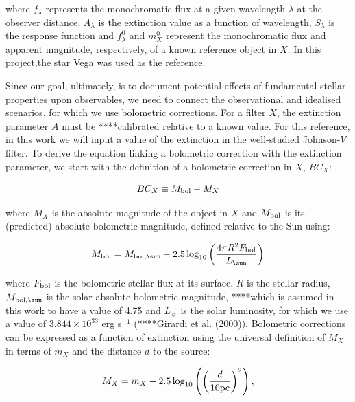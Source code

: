 \documentclass[usenatbib]{mnras}
\begin{document}
where $f_{\lambda}$ represents the monochromatic flux at a given wavelength $\lambda$ at the observer distance, $A_{\lambda}$ is the extinction value as a function of wavelength, $S_{\lambda}$ is the response function and $f_{\lambda}^{0}$ and $m_{X}^{0}$ represent the monochromatic flux and apparent magnitude, respectively, of a known reference object in $X$. In this project,the star Vega was used as the reference.

Since our goal, ultimately, is to document potential effects of fundamental stellar properties upon observables, we need to connect the observational and idealised scenarios, for which we use bolometric corrections. For a filter $X$, the extinction parameter $A$ must be ****calibrated relative to a known value. For this reference, in this work we will input a value of the extinction in the well-studied Johnson-$V$ filter.
To derive the equation linking a bolometric correction with the extinction parameter, we start with the definition of a bolometric correction in $X$, $BC_{X}$:

\begin{equation}
BC_{X} \equiv M_{\textnormal{bol}} - M_{X}
\label{BC_def}
\end{equation}

where $M_{X}$ is the absolute magnitude of the object in $X$ and $M_{\textnormal{bol}}$ is its (predicted) absolute bolometric magnitude, defined relative to the Sun using:

\begin{equation}
M_{\textnormal{bol}} = M_{\textnormal{bol},\sun} - 2.5 \log_{10} \left( \frac{4\pi R^{2}F_{\textnormal{bol}}}{L_{\sun}} \right)
\label{mbol_sun}
\end{equation}

where  $F_{\textnormal{bol}}$ is the bolometric stellar flux at its surface, $R$ is the stellar radius, $M_{\textnormal{bol},\sun}$ is the solar absolute bolometric magnitude, ****which is assumed in this work to have a value of 4.75 and $L_{\sun}$ is the solar luminosity, for which we use a value of $3.844 \times 10^{33}$ erg s$^{-1}$ (****Girardi et al. (2000)). Bolometric corrections can be expressed as a function of extinction using the universal definition of $M_{X}$ in terms of $m_{X}$ and the distance $d$ to the source:

\begin{equation}
M_{X} = m_{X} - 2.5 \log_{10}\left( \left( \frac{d}{10 \textnormal{pc}} \right)^{2} \right),
\label{BC_def}
\end{equation}
\end{document}

